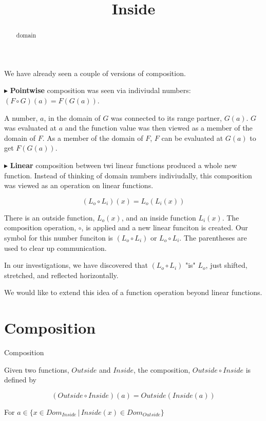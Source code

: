 \documentclass{ximera}
\title{Inside}
\begin{document}
\begin{abstract}
domain
\end{abstract}
\maketitle



We have already seen a couple of versions of composition.

$\blacktriangleright$ \textbf{Pointwise} composition was seen via indiviudal numbers: $(F \circ G)(a) = F(G(a))$.

A number, $a$, in the domain of $G$ was connected to its range partner, $G(a)$.  $G$ was evaluated at $a$ and the function value was then viewed as a member of the domain of $F$.  As a member of the domain of $F$, $F$ can be evaluated at $G(a)$ to get $F(G(a))$.




$\blacktriangleright$ \textbf{Linear} composition between twi linear functions produced a whole new function.  Instead of thinking of domain numbers indiviudally, this composition was viewed as an operation on linear functions.

\[    (L_o \circ L_i)(x) = L_o(L_i(x))  \]

There is an outside function, $L_o(x)$, and an inside function $L_i(x)$.  The composition operation, $\circ$, is applied and a new linear funciton is created.  Our symbol for this number funciton is $(L_o \circ L_i)$ or $L_o \circ L_i$.  The parentheses are used to clear up communication.

In our investigations, we have discovered that $(L_o \circ L_i)$ "is" $L_o$, just shifted, stretched, and reflected horizontally.


We would like to extend this idea of a function operation beyond linear functions.





\section{Composition}





\begin{definition} Composition


Given two functions, $Outside$ and $Inside$, the composition, $Outside \circ Inside$ is defined by

\[      (Outside \circ Inside)(a) = Outside(Inside(a))        \]

For $ a \in \{  x \in Dom_{Inside} \, | \,    Inside(x) \in Dom_{Outside}  \}$

\end{definition}
\end{document}
